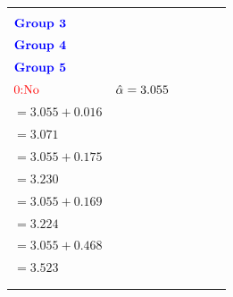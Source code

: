 \documentclass[]{book}
\theoremstyle{definition}
\theoremstyle{definition}
\theoremstyle{remark}
\begin{document}
\begin{longtable}[]{@{}llllll@{}}
\begin{minipage}[b]{0.15\columnwidth}
\end{minipage} & \begin{minipage}[b]{0.15\columnwidth}\raggedright\strut
\(\color{blue}{\textbf{Income}}\)\\
\(\color{blue}{\textbf{Group 3}}\)\strut
\end{minipage} & \begin{minipage}[b]{0.15\columnwidth}\raggedright\strut
\(\color{blue}{\textbf{Income}}\)\\
\(\color{blue}{\textbf{Group 4}}\)\strut
\end{minipage} & \begin{minipage}[b]{0.15\columnwidth}\raggedright\strut
\(\color{blue}{\textbf{Income}}\)\\
\(\color{blue}{\textbf{Group 5}}\)\strut
\end{minipage}\tabularnewline
\midrule
\endhead
\begin{minipage}[t]{0.12\columnwidth}\raggedright\strut
\(\color{red}{\text{0:No}}\)\strut
\end{minipage} & \begin{minipage}[t]{0.12\columnwidth}\raggedright\strut
\(\hat{\alpha} ={\small 3.055}\)\strut
\end{minipage} & \begin{minipage}[t]{0.15\columnwidth}\raggedright\strut
\(\hat{\alpha} + \hat{\tau}_2\)\\
\(=3.055 + 0.016\)\\
\(= 3.071\)\strut
\end{minipage} & \begin{minipage}[t]{0.15\columnwidth}\raggedright\strut
\(\hat{\alpha} + \hat{\tau}_3\)\\
\(=3.055 + 0.175\)\\
\(=3.230\)\strut
\end{minipage} & \begin{minipage}[t]{0.15\columnwidth}\raggedright\strut
\(\hat{\alpha} + \hat{\tau}_4\)\\
\(=3.055 + 0.169\)\\
\(=3.224\)\strut
\end{minipage} & \begin{minipage}[t]{0.15\columnwidth}\raggedright\strut
\(\hat{\alpha} + \hat{\tau}_5\)\\
\(=3.055 + 0.468\)\\
\(=3.523\)\\
\strut
\end{minipage}\tabularnewline
\begin{minipage}[t]{0.12\columnwidth}\raggedright\strut

\end{minipage}
\end{longtable}
\end{document}

